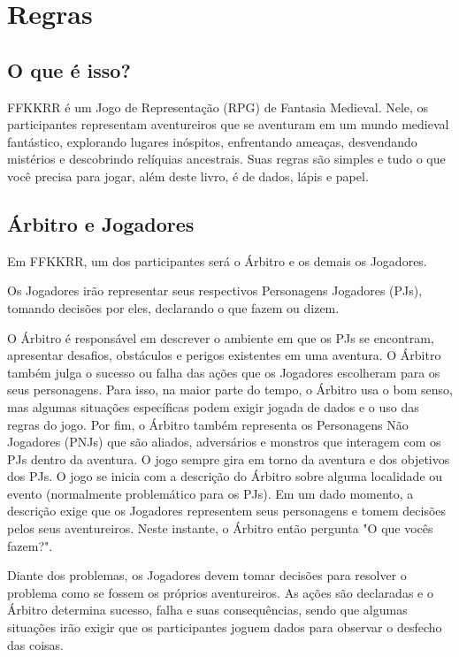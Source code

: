 \documentclass[a4paper, twocolumn, 10pt]{book}
\begin{document}
\tableofcontents

\chapter{Regras}

\section{O que é isso?}

FFKKRR é um Jogo de Representação (RPG) de Fantasia Medieval. Nele, os participantes representam aventureiros que se aventuram em um mundo medieval fantástico, explorando lugares inóspitos, enfrentando ameaças, desvendando mistérios e descobrindo relíquias ancestrais. Suas regras são simples e tudo o que você precisa para jogar, além deste livro, é de dados, lápis e papel.

\section{Árbitro e Jogadores}

Em FFKKRR, um dos participantes será o Árbitro e os demais os Jogadores.

Os Jogadores irão representar seus respectivos Personagens Jogadores (PJs), tomando decisões por eles, declarando o que fazem ou dizem.

O Árbitro é responsável em descrever o ambiente em que os PJs se encontram, apresentar desafios, obstáculos e perigos existentes em uma aventura. O Árbitro também julga o sucesso ou falha das ações que os Jogadores escolheram para os seus personagens. Para isso, na maior parte do tempo, o Árbitro usa o bom senso, mas algumas situações específicas podem exigir jogada de dados e o uso das regras do jogo. Por fim, o Árbitro também representa os Personagens Não Jogadores (PNJs) que são aliados, adversários e monstros que interagem com os PJs dentro da aventura.   
O jogo sempre gira em torno da aventura e dos objetivos dos PJs. O jogo se inicia com a descrição do Árbitro sobre alguma localidade ou evento (normalmente problemático para os PJs). Em um dado momento, a descrição exige que os Jogadores representem seus personagens e tomem decisões pelos seus aventureiros. Neste instante, o Árbitro então pergunta "O que vocês fazem?".

Diante dos problemas, os Jogadores devem tomar decisões para resolver o problema como se fossem os próprios aventureiros. As ações são declaradas e o Árbitro determina sucesso, falha e suas consequências, sendo que algumas situações irão exigir que os participantes joguem dados para observar o desfecho das coisas.
\end{document}
